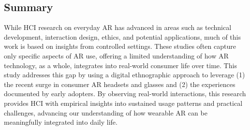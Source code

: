 \subsection{Summary}

While HCI research on everyday AR has advanced in areas such as technical development, interaction design, ethics, and potential applications, much of this work is based on insights from controlled settings. These studies often capture only specific aspects of AR use, offering a limited understanding of how AR technology, as a whole, integrates into real-world consumer life over time. This study addresses this gap by using a digital ethnographic approach to leverage (1) the recent surge in consumer AR headsets and glasses and (2) the experiences documented by early adopters. By observing real-world interactions, this research provides HCI with empirical insights into sustained usage patterns and practical challenges, advancing our understanding of how wearable AR can be meaningfully integrated into daily life.